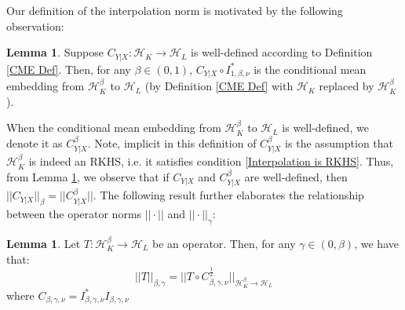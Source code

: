\documentclass[accepted]{article}
\theoremstyle{definition}
\newtheorem{lemma}[theorem]{Lemma}
\begin{document}
Our definition of the interpolation norm is motivated by the following observation:
\begin{lemma}
\label{Equivalence of Mean Embeddings}
Suppose $C_{Y|X}: \mathcal{H}_K \to \mathcal{H}_L$ is well-defined according to Definition \ref{CME Def}. Then, for any $\beta \in (0, 1)$, $C_{Y|X} \circ I^{*}_{1, \beta, \nu}$ is the conditional mean embedding from $\mathcal{H}^{\beta}_K$ to $\mathcal{H}_L$ (by Definition \ref{CME Def} with $\mathcal{H}_{K}$ replaced by $\mathcal{H}^{\beta}_{K}$).
\end{lemma}

When the conditional mean embedding from $\mathcal{H}^{\beta}_{K}$ to $\mathcal{H}_L$ is well-defined, we denote it as $C^{\beta}_{Y|X}$. Note, implicit in this definition of $C^{\beta}_{Y|X}$ is the assumption that $\mathcal{H}^{\beta}_K$ is indeed an RKHS, i.e. it satisfies condition \eqref{Interpolation is RKHS}.  Thus, from Lemma \ref{Equivalence of Mean Embeddings}, we observe that if $C_{Y|X}$ and $C^{\beta}_{Y|X}$  are well-defined, then $||C_{Y|X}||_{\beta} = ||C^{\beta}_{Y|X}||$. The following result further elaborates the relationship between the operator norms $||\cdot||$ and $||\cdot||_{\gamma}$:
\begin{lemma}
\label{Operator Norms in Interpolation Spaces}
Let $T: \mathcal{H}^{\beta}_K \to \mathcal{H}_L$ be an operator. Then, for any $\gamma \in (0, \beta)$, we have that:
\begin{equation*}
    ||T||_{\beta, \gamma} = ||T \circ C_{\beta, \gamma, \nu}^{\frac{1}{2}}||_{\mathcal{H}^{\beta}_K \to \mathcal{H}_L}
\end{equation*}
where $C_{\beta, \gamma, \nu} = I^{*}_{\beta, \gamma, \nu}I_{\beta, \gamma, \nu}$ 
\end{lemma}
\end{document}
